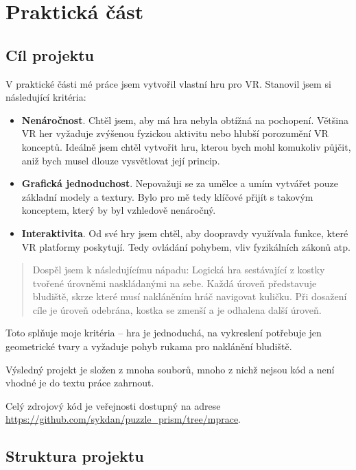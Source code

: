 \part{Praktická část}

\chapter{Cíl projektu}

V praktické části mé práce jsem vytvořil vlastní hru pro VR. Stanovil jsem si následující kritéria:

\begin{itemize}
  \item \textbf{Nenáročnost}. Chtěl jsem, aby má hra nebyla obtížná na pochopení. Většina VR her vyžaduje zvýšenou fyzickou aktivitu nebo hlubší porozumění VR konceptů. Ideálně jsem chtěl vytvořit hru, kterou bych mohl komukoliv půjčit, aniž bych musel dlouze vysvětlovat její princip.
  \item \textbf{Grafická jednoduchost}. Nepovažuji se za umělce a umím vytvářet pouze základní modely a textury. Bylo pro mě tedy klíčové přijít s takovým konceptem, který by byl vzhledově nenáročný.
  \item \textbf{Interaktivita}. Od své hry jsem chtěl, aby doopravdy využívala funkce, které VR platformy poskytují. Tedy ovládání pohybem, vliv fyzikálních zákonů atp.
\end{itemize}

\begin{quotation}
  
Dospěl jsem k následujícímu nápadu: Logická hra sestávající z kostky tvořené úrovněmi naskládanými na sebe. Každá úroveň představuje bludiště, skrze které musí nakláněním hráč navigovat kuličku. Při dosažení cíle je úroveň odebrána, kostka se zmenší a je odhalena další úroveň.
\end{quotation}

Toto splňuje moje kritéria -- hra je jednoduchá, na vykreslení potřebuje jen geometrické tvary a vyžaduje pohyb rukama pro naklánění bludiště.

Výsledný projekt je složen z mnoha souborů, mnoho z nichž nejsou kód a není vhodné je do textu práce zahrnout. 

Celý zdrojový kód je veřejnosti dostupný na adrese \url{https://github.com/sykdan/puzzle_prism/tree/mprace}. 

\chapter{Struktura projektu}

